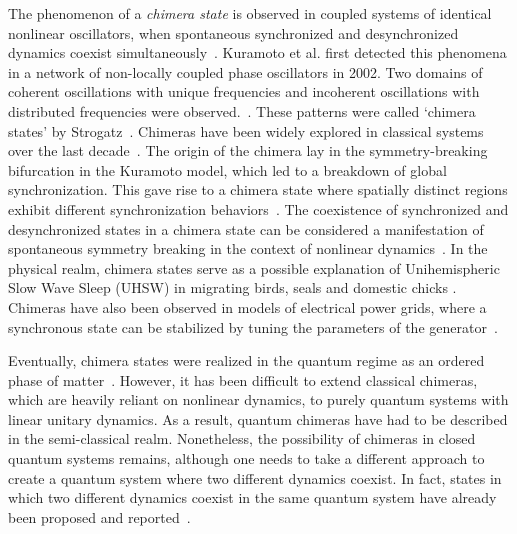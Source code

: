\documentclass[12pt]{iopart}
\begin{document}
The phenomenon of a \textit{ chimera state} is observed in coupled systems of  identical nonlinear oscillators, when spontaneous synchronized and desynchronized dynamics coexist simultaneously~\cite{kuramoto_coexistence_2002, panaggio_chimera_2015}. Kuramoto et al. first detected this phenomena in a network of non-locally coupled phase oscillators in 2002. Two domains of coherent oscillations with unique frequencies and incoherent oscillations with distributed frequencies were observed.~\cite{kuramoto_coexistence_2002}. These patterns were called ‘chimera states’ by Strogatz~\cite{chimera:strogatz}. Chimeras have been widely explored in classical systems over the last decade~\cite{parastesh_chimeras_2021,chimera_book, taniya2022}. The origin of the chimera lay in the symmetry-breaking bifurcation in the Kuramoto model, which led to a breakdown of global synchronization. This gave rise to a chimera state where spatially distinct regions exhibit different synchronization behaviors~\cite{Kotwal2017}. The coexistence of synchronized and desynchronized states in a chimera state can be considered a manifestation of spontaneous symmetry breaking in the context of nonlinear dynamics~\cite{Aneta2013}. In the physical realm, chimera states serve as a possible explanation of Unihemispheric Slow Wave Sleep (UHSW) in migrating birds, seals and domestic chicks \cite{Rattenborg2000, Rattenborg2006, Rattenborg2016}. 
Chimeras have also been observed in models of electrical power grids, where a synchronous state can be stabilized by tuning the parameters of the generator~\cite{Motter2013}. 

Eventually, chimera states were realized in the quantum regime as an ordered phase of matter~\cite{bastidas_quantum_2015}. However, it has been difficult to extend classical chimeras, which are heavily reliant on nonlinear dynamics, to purely quantum systems with linear unitary dynamics. As a result, quantum chimeras have had to be described in the semi-classical realm. Nonetheless, the possibility of chimeras in closed quantum systems remains, although one needs to take a different approach to create a quantum system where two different dynamics coexist. In fact, states in which two different dynamics coexist in the same quantum system have already been proposed and reported~\cite{Bastidas2018, Zha2020, sakurai_phys_nodate}.
\end{document}
